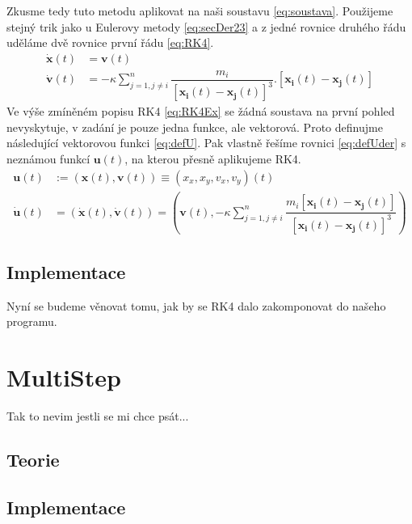 Zkusme tedy tuto metodu aplikovat na naši soustavu \eqref{eq:soustava}. Použijeme stejný trik jako u Eulerovy metody \eqref{eq:secDer23} a z jedné rovnice druhého řádu uděláme dvě rovnice první řádu \eqref{eq:RK4}.
\begin{subequations}
	\label{eq:RK4}
	\begin{align}
	\label{eq:RK4pos}
	\dot{\boldsymbol{x}}(t)&=\boldsymbol{v}(t)\\
	\label{eq:RK4vel}
	\dot{\boldsymbol{v}}(t)&=-  \kappa \sum_{j=1,j \neq i}^{n}\dfrac{m_i}
	{\left[ \boldsymbol{x_i}(t) - \boldsymbol{x_j}(t)\right] ^3} . 
	\left[ \boldsymbol{x_i}(t) - \boldsymbol{x_j}(t)\right] 
	\end{align}
\end{subequations}
Ve výše zmíněném popisu RK4 \eqref{eq:RK4Ex} se žádná soustava na první pohled nevyskytuje, v zadání je pouze jedna funkce, ale vektorová. Proto definujme následující vektorovou funkci \eqref{eq:defU}. Pak vlastně řešíme rovnici \eqref{eq:defUder} s neznámou funkcí $ \boldsymbol{u}(t) $, na kterou přesně aplikujeme RK4.
\begin{align}
	\label{eq:defU}
	\boldsymbol{u}(t) &:= (\boldsymbol{x}(t),\boldsymbol{v}(t)) \equiv(x_x,x_y,v_x,v_y)(t)\\
	\label{eq:defUder}
	 \boldsymbol{\dot{u}}(t)&=(\dot{\boldsymbol{x}}(t),\dot{\boldsymbol{v}}(t))=
	 (\boldsymbol{v}(t), -\kappa \sum_{j=1,j \neq i}^{n}\dfrac{m_i\left[ \boldsymbol{x_i}(t) - \boldsymbol{x_j}(t)\right]}
	 {\left[ \boldsymbol{x_i}(t) - \boldsymbol{x_j}(t)\right] ^3}
	  )
\end{align}


\subsection{Implementace}
Nyní se budeme věnovat tomu, jak by se RK4 dalo zakomponovat do našeho programu.

\section{MultiStep}
\label{sec:implMultiStep}
Tak to nevim jestli se mi chce psát...
\subsection{Teorie}
\subsection{Implementace}
